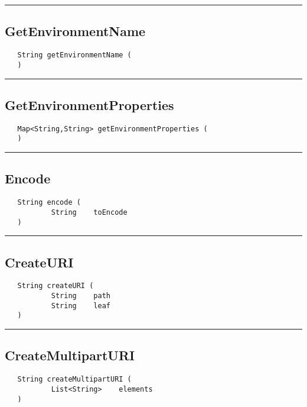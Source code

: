 \rule{15cm}{2pt}
\subsection{GetEnvironmentName}
\label{Api:GetEnvironmentName}
\begin{verbatim}
   String getEnvironmentName (
   )
\end{verbatim}



\rule{15cm}{2pt}
\subsection{GetEnvironmentProperties}
\label{Api:GetEnvironmentProperties}
\begin{verbatim}
   Map<String,String> getEnvironmentProperties (
   )
\end{verbatim}



\rule{15cm}{2pt}
\subsection{Encode}
\label{Api:Encode}
\begin{verbatim}
   String encode (
           String    toEncode
   )
\end{verbatim}



\rule{15cm}{2pt}
\subsection{CreateURI}
\label{Api:CreateURI}
\begin{verbatim}
   String createURI (
           String    path
           String    leaf
   )
\end{verbatim}



\rule{15cm}{2pt}
\subsection{CreateMultipartURI}
\label{Api:CreateMultipartURI}
\begin{verbatim}
   String createMultipartURI (
           List<String>    elements
   )
\end{verbatim}



